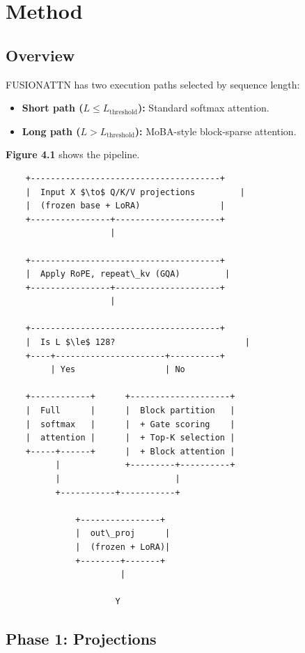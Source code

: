 \section{Method}

\subsection{Overview}

FUSIONATTN has two execution paths selected by sequence length:

\begin{itemize}
\item \textbf{Short path ($L \leq L_\text{threshold}$):} Standard softmax attention.
\item \textbf{Long path ($L > L_\text{threshold}$):} MoBA-style block-sparse attention.

\end{itemize}
\textbf{Figure 4.1} shows the pipeline.

\begin{lstlisting}
    +--------------------------------------+
    |  Input X $\to$ Q/K/V projections         |
    |  (frozen base + LoRA)                |
    +----------------+---------------------+
                     |
                      
    +--------------------------------------+
    |  Apply RoPE, repeat\_kv (GQA)         |
    +----------------+---------------------+
                     |
                      
    +--------------------------------------+
    |  Is L $\le$ 128?                          |
    +----+----------------------+----------+
         | Yes                  | No
                                 
    +------------+      +--------------------+
    |  Full      |      |  Block partition   |
    |  softmax   |      |  + Gate scoring    |
    |  attention |      |  + Top-K selection |
    +-----+------+      |  + Block attention |
          |             +---------+----------+
          |                       |
          +-----------+-----------+
                       
              +----------------+
              |  out\_proj      |
              |  (frozen + LoRA)|
              +--------+-------+
                       |
                        
                      Y
\end{lstlisting}

\subsection{Phase 1: Projections}

